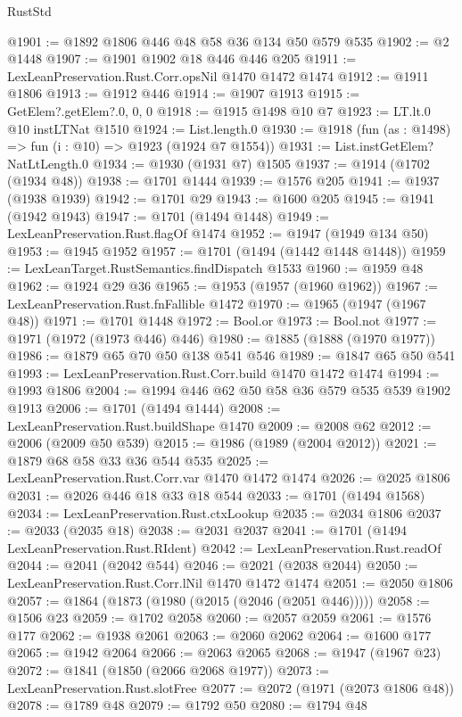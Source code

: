 \begin{lexlean}{RustStd}
\begin{coremodule}
@1901 := @1892 @1806 @446 @48 @58 @36 @134 @50 @579 @535
@1902 := @2 @1448
@1907 := @1901 @1902 @18 @446 @446 @205
@1911 := LexLeanPreservation.Rust.Corr.opsNil @1470 @1472 @1474
@1912 := @1911 @1806
@1913 := @1912 @446
@1914 := @1907 @1913
@1915 := GetElem?.getElem?.{0, 0, 0}
@1918 := @1915 @1498 @10 @7
@1923 := LT.lt.{0} @10 instLTNat @1510
@1924 := List.length.{0}
@1930 := @1918 (fun (as : @1498) => fun (i : @10) => @1923 (@1924 @7 @1554))
@1931 := List.instGetElem?NatLtLength.{0}
@1934 := @1930 (@1931 @7) @1505
@1937 := @1914 (@1702 (@1934 @48))
@1938 := @1701 @1444
@1939 := @1576 @205
@1941 := @1937 (@1938 @1939)
@1942 := @1701 @29
@1943 := @1600 @205
@1945 := @1941 (@1942 @1943)
@1947 := @1701 (@1494 @1448)
@1949 := LexLeanPreservation.Rust.flagOf @1474
@1952 := @1947 (@1949 @134 @50)
@1953 := @1945 @1952
@1957 := @1701 (@1494 (@1442 @1448 @1448))
@1959 := LexLeanTarget.RustSemantics.findDispatch @1533
@1960 := @1959 @48
@1962 := @1924 @29 @36
@1965 := @1953 (@1957 (@1960 @1962))
@1967 := LexLeanPreservation.Rust.fnFallible @1472
@1970 := @1965 (@1947 (@1967 @48))
@1971 := @1701 @1448
@1972 := Bool.or
@1973 := Bool.not
@1977 := @1971 (@1972 (@1973 @446) @446)
@1980 := @1885 (@1888 (@1970 @1977))
@1986 := @1879 @65 @70 @50 @138 @541 @546
@1989 := @1847 @65 @50 @541
@1993 := LexLeanPreservation.Rust.Corr.build @1470 @1472 @1474
@1994 := @1993 @1806
@2004 := @1994 @446 @62 @50 @58 @36 @579 @535 @539 @1902 @1913
@2006 := @1701 (@1494 @1444)
@2008 := LexLeanPreservation.Rust.buildShape @1470
@2009 := @2008 @62
@2012 := @2006 (@2009 @50 @539)
@2015 := @1986 (@1989 (@2004 @2012))
@2021 := @1879 @68 @58 @33 @36 @544 @535
@2025 := LexLeanPreservation.Rust.Corr.var @1470 @1472 @1474
@2026 := @2025 @1806
@2031 := @2026 @446 @18 @33 @18 @544
@2033 := @1701 (@1494 @1568)
@2034 := LexLeanPreservation.Rust.ctxLookup
@2035 := @2034 @1806
@2037 := @2033 (@2035 @18)
@2038 := @2031 @2037
@2041 := @1701 (@1494 LexLeanPreservation.Rust.RIdent)
@2042 := LexLeanPreservation.Rust.readOf
@2044 := @2041 (@2042 @544)
@2046 := @2021 (@2038 @2044)
@2050 := LexLeanPreservation.Rust.Corr.lNil @1470 @1472 @1474
@2051 := @2050 @1806
@2057 := @1864 (@1873 (@1980 (@2015 (@2046 (@2051 @446)))))
@2058 := @1506 @23
@2059 := @1702 @2058
@2060 := @2057 @2059
@2061 := @1576 @177
@2062 := @1938 @2061
@2063 := @2060 @2062
@2064 := @1600 @177
@2065 := @1942 @2064
@2066 := @2063 @2065
@2068 := @1947 (@1967 @23)
@2072 := @1841 (@1850 (@2066 @2068 @1977))
@2073 := LexLeanPreservation.Rust.slotFree
@2077 := @2072 (@1971 (@2073 @1806 @48))
@2078 := @1789 @48
@2079 := @1792 @50
@2080 := @1794 @48

\end{coremodule}
\end{lexlean}
